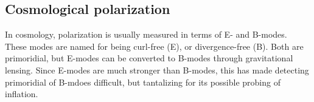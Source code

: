 \documentclass[a4paper,11pt]{scrartcl}
\begin{document}
\subsection{Cosmological polarization}

In cosmology, polarization is usually measured in terms of E- and B-modes. These modes are named for being curl-free (E), or divergence-free (B). Both are primoridial, but E-modes can be converted to B-modes through gravitational lensing. Since E-modes are much stronger than B-modes, this has made detecting primoridial of B-mdoes difficult, but tantalizing for its possible probing of inflation.
\end{document}
